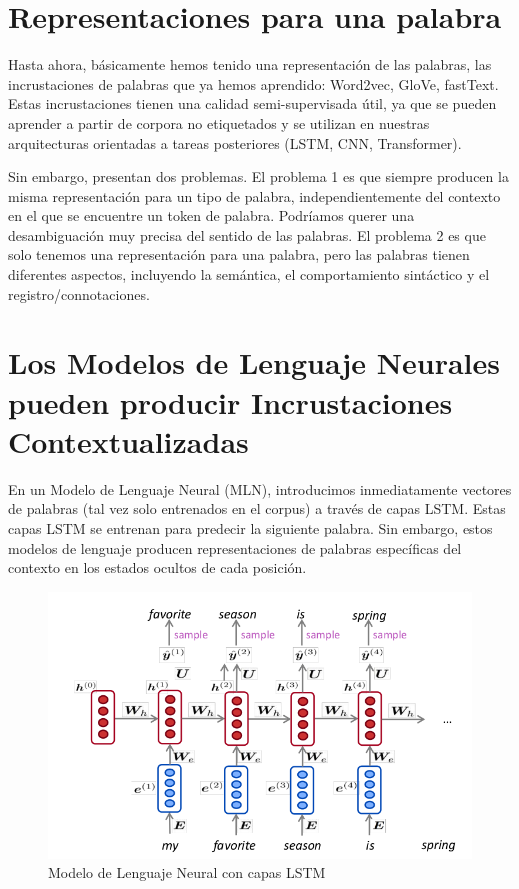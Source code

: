 
\section{Representaciones para una palabra}

Hasta ahora, básicamente hemos tenido una representación de las palabras, las incrustaciones de palabras que ya hemos aprendido: Word2vec, GloVe, fastText. Estas incrustaciones tienen una calidad semi-supervisada útil, ya que se pueden aprender a partir de corpora no etiquetados y se utilizan en nuestras arquitecturas orientadas a tareas posteriores (LSTM, CNN, Transformer).

Sin embargo, presentan dos problemas. El problema 1 es que siempre producen la misma representación para un tipo de palabra, independientemente del contexto en el que se encuentre un token de palabra. Podríamos querer una desambiguación muy precisa del sentido de las palabras. El problema 2 es que solo tenemos una representación para una palabra, pero las palabras tienen diferentes aspectos, incluyendo la semántica, el comportamiento sintáctico y el registro/connotaciones.

\section{Los Modelos de Lenguaje Neurales pueden producir Incrustaciones Contextualizadas}

En un Modelo de Lenguaje Neural (MLN), introducimos inmediatamente vectores de palabras (tal vez solo entrenados en el corpus) a través de capas LSTM. Estas capas LSTM se entrenan para predecir la siguiente palabra. Sin embargo, estos modelos de lenguaje producen representaciones de palabras específicas del contexto en los estados ocultos de cada posición.

\begin{figure}[h]
  \centering
  \includegraphics[scale=0.4]{pics/lstm_nlm.png}
  \caption{Modelo de Lenguaje Neural con capas LSTM}
\end{figure}

